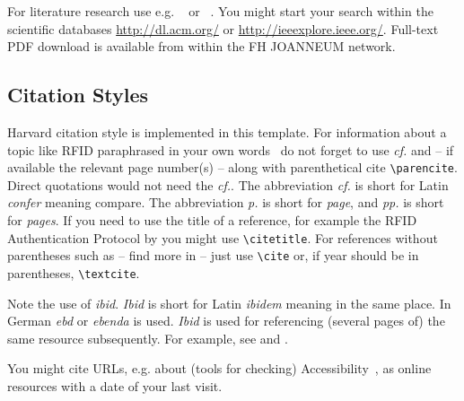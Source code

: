 For literature research use e.g. 
~\parencite{acm:diglibrary} or
~\parencite{ieee:xplore}. 
You might start your search within the scientific databases 
\url{http://dl.acm.org/} or \url{http://ieeexplore.ieee.org/}. 
Full-text PDF download is available from within the FH JOANNEUM network.


\subsection{Citation Styles}

Harvard citation style is implemented in this template. For information about
a topic like RFID paraphrased in your own 
words~\parencite[cf.][p. 317]{Batina:2011} do not forget to use \emph{cf.}
and -- if available the relevant page number(s) -- along with parenthetical 
cite \verb+\parencite+. Direct quotations would not need the \emph{cf.}. 
The abbreviation \emph{cf.} is short for Latin \emph{confer} meaning compare. 
The abbreviation \emph{p.} is short for \emph{page}, and \emph{pp.} is short for \emph{pages}. 
If you need to use the title of a reference, for example the RFID Authentication 
Protocol by  you might use \verb+\citetitle+. 
For references without parentheses such as -- find more in \cite{Li:2008} 
-- just use \verb+\cite+ or, if year should be in parentheses,  
\textcite{Batina:2011} \verb+\textcite+.

\begin{spar}
  Note the use of \emph{ibid}. \emph{Ibid} is short for Latin \emph{ibidem}
  meaning in the same place. In German \emph{ebd} or \emph{ebenda} is used. 
  \emph{Ibid} is used for referencing (several pages of) the same resource 
  subsequently. For example, 
  see \citep[cf.][p. 317]{Batina:2011} and \citep[cf.][pp. 321-–323]{Batina:2011} 
  \citep[cf.][p. 399]{Batina:2011}.
\end{spar}

You might cite URLs, e.g. about (tools for checking) 
Accessibility~\parencite[cf.][]{Google:2017a,Google:2016a}, as online 
resources with a date of your last visit.




